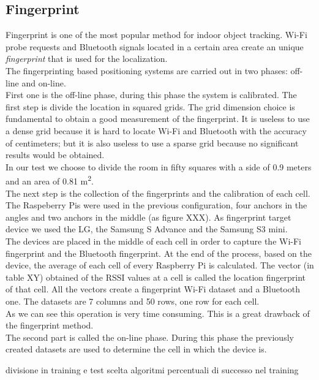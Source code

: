 \subsection{Fingerprint}
Fingerprint is one of the most popular method for indoor object tracking. Wi-Fi probe requests and Bluetooth signals located in a certain area create an unique \textit{fingerprint}  that is used for the localization.\\
The fingerprinting based positioning systems are carried out in two phases: off-line and on-line.\\
\linebreak
First one is the off-line phase, during this phase the system is calibrated. The first step is divide the location in squared grids. The grid dimension choice is fundamental to obtain a good measurement of the fingerprint. It is useless to use a dense grid because it is hard to locate Wi-Fi and Bluetooth with the accuracy of centimeters; but it is also useless to use a sparse grid because no significant results would be obtained. \\
In our test we choose to divide the room in fifty squares with a side of 0.9 meters and an area of 0.81 m\textsuperscript{2}.\\
\linebreak
The next step is the collection of the fingerprints and the calibration of each cell. The Raspeberry Pis were used in the previous configuration, four anchors in the angles and two anchors in the middle (as figure XXX). As fingerprint target device we used the LG, the Samsung S Advance and the Samsung S3 mini.\\
The devices are placed in the middle of each cell in order to capture the Wi-Fi fingerprint and the Bluetooth fingerprint. At the end of the process, based on the device, the average of each cell of every Raspberry Pi is calculated. The vector (in table XY) obtained of the RSSI values at a cell is called the location fingerprint of that cell. All the vectors create a fingerprint Wi-Fi dataset and a Bluetooth one.  The datasets are 7 columns and 50 rows, one row for each cell.\\
As we can see this operation is very time consuming. This is a great drawback of the fingerprint method.\\
\linebreak
The second part is called the on-line phase. During this phase the previously created datasets are used to determine the cell in which the device is.

divisione in training e test
scelta algoritmi
percentuali di successo nel training

